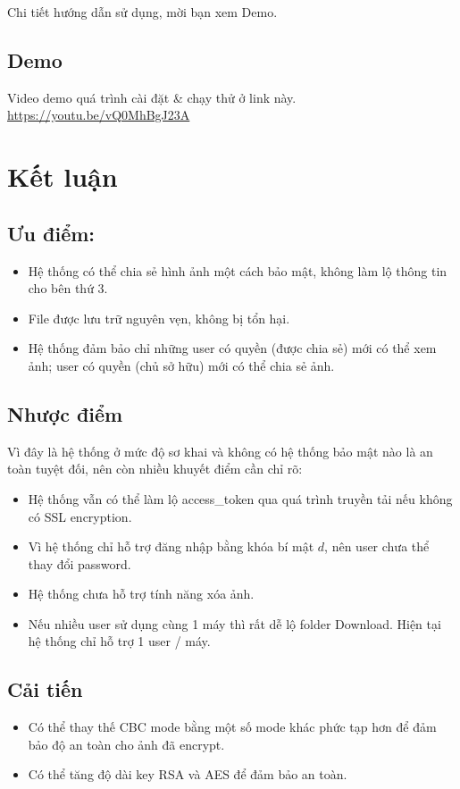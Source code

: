 \documentclass[12pt]{article}
\begin{document}
Chi tiết hướng dẫn sử dụng, mời bạn xem Demo.

\subsection{Demo}
Video demo quá trình cài đặt \& chạy thử ở link này.
\href{https://youtu.be/vQ0MhBgJ23A}{https://youtu.be/vQ0MhBgJ23A}

\section{Kết luận}
\subsection{Ưu điểm:}
\begin{itemize}
    \item Hệ thống có thể chia sẻ hình ảnh một cách bảo mật, không làm lộ thông tin cho bên thứ 3.
    \item File được lưu trữ nguyên vẹn, không bị tổn hại.
    \item Hệ thống đảm bảo chỉ những user có quyền (được chia sẻ) mới có thể xem ảnh; user có quyền (chủ sở hữu) mới có thể chia sẻ ảnh.
\end{itemize}
\subsection{Nhược điểm}
Vì đây là hệ thống ở mức độ sơ khai và không có hệ thống bảo mật nào là an toàn tuyệt đối, nên còn nhiều khuyết điểm cần chỉ rõ:
\begin{itemize}
    \item Hệ thống vẫn có thể làm lộ access\_token qua quá trình truyền tải nếu không có SSL encryption.
    \item Vì hệ thống chỉ hỗ trợ đăng nhập bằng khóa bí mật $d$, nên user chưa thể thay đổi password.
    \item Hệ thống chưa hỗ trợ tính năng xóa ảnh.
    \item Nếu nhiều user sử dụng cùng 1 máy thì rất dễ lộ folder Download. Hiện tại hệ thống chỉ hỗ trợ 1 user / máy.
\end{itemize}

\subsection{Cải tiến}
\begin{itemize}
    \item Có thể thay thế CBC mode bằng một số mode khác phức tạp hơn để đảm bảo độ an toàn cho ảnh đã encrypt.
    \item Có thể tăng độ dài key RSA và AES để đảm bảo an toàn.
\end{itemize}

\pagebreak
\printbibliography
\end{document}
